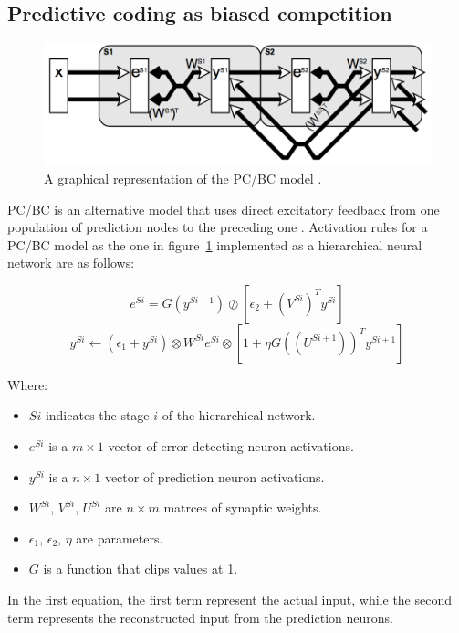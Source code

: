 \documentclass[11pt,a4paper]{report}
\begin{document}
			\subsection{Predictive coding as biased competition}
				\begin{figure}[h]
					\centering
					\includegraphics[scale=0.4]{pcbc}
					\caption{A graphical representation of the PC/BC model \cite{spratling2008predictive}.}
					\label{fig:pcbc}
				\end{figure}
				
				PC/BC is an alternative model that uses direct excitatory feedback from one population of prediction nodes to the preceding one \cite{spratling2008predictive}.
				Activation rules for a PC/BC model as the one in figure~\ref{fig:pcbc} implemented as a hierarchical neural network are as follows:
				
				$$e^{Si} = G(y^{Si-1}) \oslash [\epsilon_2 + (V^{Si})^T y^{Si}]$$
				$$y^{Si} \leftarrow (\epsilon_1 + y^{Si}) \otimes W^{Si}e^{Si} \otimes [1 + \eta G((U^{Si+1}))^T y^{Si+1}]$$
				
				Where:
				\begin{itemize}
					\item $Si$ indicates the stage $i$ of the hierarchical network.
					\item $e^{Si}$ is a $m \times 1$ vector of error-detecting neuron activations.
					\item $y^{Si}$ is a $n \times 1$ vector of prediction neuron activations.
					\item $W^{Si}$, $V^{Si}$, $U^{Si}$ are $n \times m$ matrces of synaptic weights.
					\item $\epsilon_1$, $\epsilon_2$, $\eta$ are parameters.
					\item $G$ is a function that clips values at 1. 
				\end{itemize}
				
				In the first equation, the first term represent the actual input, while the second term represents the reconstructed input from the prediction neurons.
				
\end{document}
